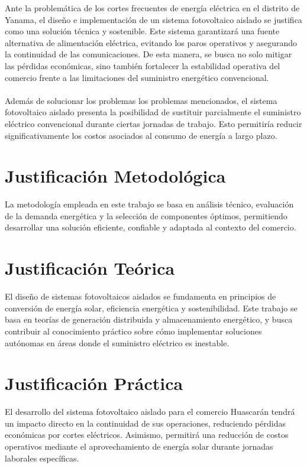 Ante la problemática de los cortes frecuentes de energía eléctrica en el distrito de Yanama, el diseño e implementación de un sistema fotovoltaico aislado se justifica como una solución técnica y sostenible. Este sistema garantizará una fuente alternativa de alimentación eléctrica, evitando los paros operativos y asegurando la continuidad de las comunicaciones. De esta manera, se busca no solo mitigar las pérdidas económicas, sino también fortalecer la estabilidad operativa del comercio frente a las limitaciones del suministro energético convencional.
\\
\\
Además de solucionar los problemas los problemas mencionados, el sistema fotovoltaico aislado presenta la posibilidad de sustituir parcialmente el suministro eléctrico convencional durante ciertas jornadas de trabajo. Esto permitiría reducir significativamente los costos asociados al consumo de energía a largo plazo.

\section{Justificación Metodológica}
La metodología empleada en este trabajo se basa en análisis técnico, evaluación de la demanda energética y la selección de componentes óptimos, permitiendo desarrollar una solución eficiente, confiable y adaptada al contexto del comercio.

\section{Justificación Teórica}
El diseño de sistemas fotovoltaicos aislados se fundamenta en principios de conversión de energía solar, eficiencia energética y sostenibilidad. Este trabajo se basa en teorías de generación distribuida y almacenamiento energético, y busca contribuir al conocimiento práctico sobre cómo implementar soluciones autónomas en áreas donde el suministro eléctrico es inestable.

\section{Justificación Práctica}
El desarrollo del sistema fotovoltaico aislado para el comercio Huascarán tendrá un impacto directo en la continuidad de sus operaciones, reduciendo pérdidas económicas por cortes eléctricos. Asimismo, permitirá una reducción de costos operativos mediante el aprovechamiento de energía solar durante jornadas laborales específicas. 

